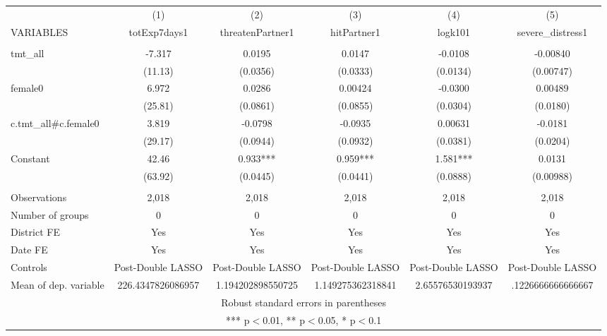 \documentclass[]{article}
\begin{document}
\begin{tabular}{lccccc} \hline
 & (1) & (2) & (3) & (4) & (5) \\
VARIABLES & totExp7days1 & threatenPartner1 & hitPartner1 & logk101 & severe\_distress1 \\ \hline
 &  &  &  &  &  \\
tmt\_all & -7.317 & 0.0195 & 0.0147 & -0.0108 & -0.00840 \\
 & (11.13) & (0.0356) & (0.0333) & (0.0134) & (0.00747) \\
female0 & 6.972 & 0.0286 & 0.00424 & -0.0300 & 0.00489 \\
 & (25.81) & (0.0861) & (0.0855) & (0.0304) & (0.0180) \\
c.tmt\_all\#c.female0 & 3.819 & -0.0798 & -0.0935 & 0.00631 & -0.0181 \\
 & (29.17) & (0.0944) & (0.0932) & (0.0381) & (0.0204) \\
Constant & 42.46 & 0.933*** & 0.959*** & 1.581*** & 0.0131 \\
 & (63.92) & (0.0445) & (0.0441) & (0.0888) & (0.00988) \\
 &  &  &  &  &  \\
Observations & 2,018 & 2,018 & 2,018 & 2,018 & 2,018 \\
Number of groups & 0 & 0 & 0 & 0 & 0 \\
District FE & Yes & Yes & Yes & Yes & Yes \\
Date FE & Yes & Yes & Yes & Yes & Yes \\
Controls & Post-Double LASSO & Post-Double LASSO & Post-Double LASSO & Post-Double LASSO & Post-Double LASSO \\
 Mean of dep. variable & 226.4347826086957 & 1.194202898550725 & 1.149275362318841 & 2.65576530193937 & .1226666666666667 \\ \hline
\multicolumn{6}{c}{ Robust standard errors in parentheses} \\
\multicolumn{6}{c}{ *** p$<$0.01, ** p$<$0.05, * p$<$0.1} \\
\end{tabular}
\end{document}
